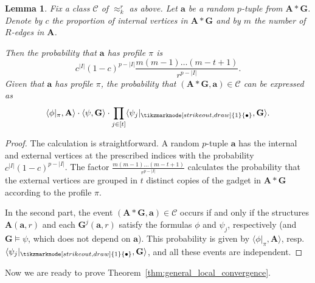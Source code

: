 \documentclass[11pt]{article}
\theoremstyle{plain}
\newtheorem{lemma}[theorem]{Lemma}
\theoremstyle{definition}
\theoremstyle{remark}
\newcommand{\stonepar}[2]{\langle #1, #2 \rangle}
\newcommand{\str}[1]{\mathbf{#1}}
\newcommand{\tpl}[1]{{\bm{#1}}}
\newcommand{\nonroot}{\tikzmarknode[strike out,draw]{1}{\bullet}}
\begin{document}
\begin{lemma}\label{lem:representation_statistics_determines_statistics}
    Fix a class $\mathcal{C}$ of $\approx_k^r$ as above.
    Let $\tpl{a}$ be a random $p$-tuple from $\str{A}*\str{G}$.
    Denote by $c$ the proportion of internal vertices in $\str{A}*\str{G}$ and by $m$ the number of $R$-edges in $\str{A}$.
    
    Then the probability that $\tpl{a}$ has profile $\pi$ is   
    \[
        c^{|I|}(1-c)^{p-|I|}\frac{m(m-1)\dots(m-t+1)}{r^{p-|I|}}
        .
    \]
    Given that $\tpl{a}$ has profile $\pi$, the probability that $(\str{A}*\str{G}, \tpl{a}) \in \mathcal{C}$ can be expressed as
    \[
        \stonepar{\phi|_\pi}{\str{A}} \cdot \stonepar{\psi}{\str{G}} \cdot \prod_{j \in [t]} \stonepar{\psi_j|_{\nonroot}}{\str{G}}
        .
    \]
\end{lemma}
\begin{proof}
    The calculation is straightforward.
    A random $p$-tuple $\tpl{a}$ has the internal and external vertices at the prescribed indices with the probability $c^{|I|}(1-c)^{p-|I|}$.
    The factor $\frac{m(m-1)\dots(m-t+1)}{r^{p-|I|}}$ calculates the probability that the external vertices are grouped in $t$ distinct copies of the gadget in $\str{A}*\str{G}$ according to the profile $\pi$.
    
    In the second part, the event $(\str{A}*\str{G}, \tpl{a}) \in \mathcal{C}$ occurs if and only if the structures $\str{A}(\tpl{a}, r)$ and each $\str{G}^j(\tpl{a}, r)$ satisfy the formulas $\phi$ and $\psi_j$, respectively (and $\str{G} \models \psi$, which does not depend on $\tpl{a}$).
    This probability is given by $\stonepar{\phi|_\pi}{\str{A}}$, resp. $\stonepar{\psi_j|_{\nonroot}}{\str{G}}$, and all these events are independent.
\end{proof}

Now we are ready to prove Theorem~\ref{thm:general_local_convergence}.
\end{document}
